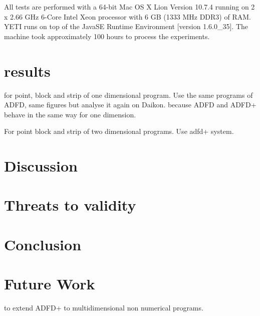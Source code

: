 All tests are performed with a 64-bit Mac OS X Lion Version 10.7.4 running on 2 x 2.66 GHz 6-Core Intel Xeon processor with 6 GB (1333 MHz DDR3) of RAM. YETI runs on top of the Java\texttrademark  SE Runtime Environment [version 1.6.0\_35]. The machine took approximately 100 hours to process the experiments.

\section{results}

for point, block and strip of one dimensional program. Use the same programs of ADFD, same figures but analyse it again on Daikon. because ADFD and ADFD+ behave in the same way for one dimension.

For point block and strip of two dimensional programs. Use adfd+ system.






\section{Discussion}
\section{Threats to validity}




\section{Conclusion}

\section{Future Work}
to extend ADFD+ to multidimensional non numerical programs.
